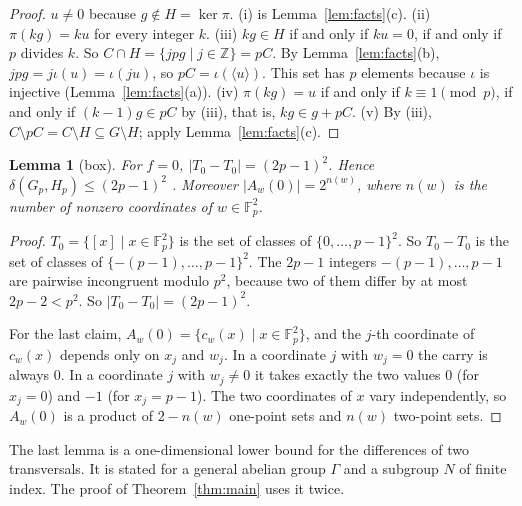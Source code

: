 \documentclass[11pt]{amsart}
\newtheorem{lemma}[theorem]{Lemma}
\theoremstyle{definition}\newtheorem{definition}[theorem]{Definition}
\theoremstyle{remark}\newtheorem{remark}[theorem]{Remark}
\newcommand{\F}{\mathbb{F}}
\newcommand{\Z}{\mathbb{Z}}
\newcommand{\abs}[1]{\lvert #1\rvert}
\newcommand{\gen}[1]{\langle #1\rangle}
\begin{document}
\begin{proof}
\(u\ne0\) because \(g\notin H=\ker\pi\).
(i) is Lemma~\ref{lem:facts}(c).
(ii) \(\pi(kg)=ku\) for every integer \(k\).
(iii) \(kg\in H\) if and only if \(ku=0\), if and only if \(p\) divides \(k\).
So \(C\cap H=\{jpg\mid j\in\Z\}=pC\).
By Lemma~\ref{lem:facts}(b), \(jpg=j\iota(u)=\iota(ju)\), so \(pC=\iota(\gen{u})\).
This set has \(p\) elements because \(\iota\) is injective (Lemma~\ref{lem:facts}(a)).
(iv) \(\pi(kg)=u\) if and only if \(k\equiv1\pmod p\), if and only if \((k-1)g\in pC\) by (iii), that is, \(kg\in g+pC\).
(v) By (iii), \(C\setminus pC=C\setminus H\subseteq G\setminus H\); apply Lemma~\ref{lem:facts}(c).
\end{proof}

\begin{lemma}[box]\label{lem:box}
For \(f=0\), \(\abs{T_0-T_0}=(2p-1)^2\).
Hence \(\delta(G_p,H_p)\le(2p-1)^2\) \textup{\cite[Proposition~5.3]{BPT}}.
Moreover \(\abs{A_w(0)}=2^{n(w)}\), where \(n(w)\) is the number of nonzero coordinates of \(w\in\F_p^2\).
\end{lemma}

\begin{proof}
\(T_0=\{[x]\mid x\in\F_p^2\}\) is the set of classes of \(\{0,\dots,p-1\}^2\).
So \(T_0-T_0\) is the set of classes of \(\{-(p-1),\dots,p-1\}^2\).
The \(2p-1\) integers \(-(p-1),\dots,p-1\) are pairwise incongruent modulo \(p^2\), because two of them differ by at most \(2p-2<p^2\).
So \(\abs{T_0-T_0}=(2p-1)^2\).

For the last claim, \(A_w(0)=\{c_w(x)\mid x\in\F_p^2\}\), and the \(j\)-th coordinate of \(c_w(x)\) depends only on \(x_j\) and \(w_j\).
In a coordinate \(j\) with \(w_j=0\) the carry is always \(0\).
In a coordinate \(j\) with \(w_j\ne0\) it takes exactly the two values \(0\) (for \(x_j=0\)) and \(-1\) (for \(x_j=p-1\)).
The two coordinates of \(x\) vary independently, so \(A_w(0)\) is a product of \(2-n(w)\) one-point sets and \(n(w)\) two-point sets.
\end{proof}

The last lemma is a one-dimensional lower bound for the differences of two transversals.
It is stated for a general abelian group \(\Gamma\) and a subgroup \(N\) of finite index.
The proof of Theorem~\ref{thm:main} uses it twice.
\end{document}
